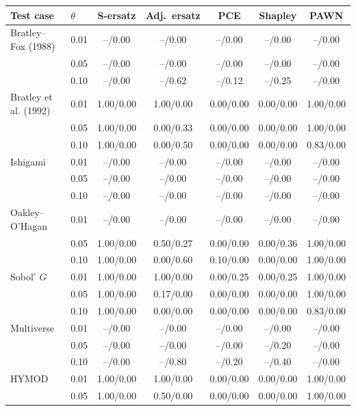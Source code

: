 \documentclass[11pt,a4paper]{article}
\begin{document}
\begin{table}[H]\centering\footnotesize
\begin{tabular}{@{}llccccc@{}}\toprule
Test case & $\theta$ & S-ersatz & Adj.\ ersatz & PCE & Shapley & PAWN \\ \midrule
Bratley--Fox (1988) & 0.01 & --/0.00 & --/0.00 & --/0.00 & --/0.00 & --/0.00 \\
 & 0.05 & --/0.00 & --/0.00 & --/0.00 & --/0.00 & --/0.00 \\
 & 0.10 & --/0.00 & --/0.62 & --/0.12 & --/0.25 & --/0.00 \\
\addlinespace[2pt]
Bratley et al. (1992) & 0.01 & 1.00/0.00 & 1.00/0.00 & 0.00/0.00 & 0.00/0.00 & 1.00/0.00 \\
 & 0.05 & 1.00/0.00 & 0.00/0.33 & 0.00/0.00 & 0.00/0.00 & 1.00/0.00 \\
 & 0.10 & 1.00/0.00 & 0.00/0.50 & 0.00/0.00 & 0.00/0.00 & 0.83/0.00 \\
\addlinespace[2pt]
Ishigami & 0.01 & --/0.00 & --/0.00 & --/0.00 & --/0.00 & --/0.00 \\
 & 0.05 & --/0.00 & --/0.00 & --/0.00 & --/0.00 & --/0.00 \\
 & 0.10 & --/0.00 & --/0.00 & --/0.00 & --/0.00 & --/0.00 \\
\addlinespace[2pt]
Oakley--O'Hagan & 0.01 & --/0.00 & --/0.00 & --/0.00 & --/0.00 & --/0.00 \\
 & 0.05 & 1.00/0.00 & 0.50/0.27 & 0.00/0.00 & 0.00/0.36 & 1.00/0.00 \\
 & 0.10 & 1.00/0.00 & 0.00/0.60 & 0.10/0.00 & 0.00/0.00 & 1.00/0.00 \\
\addlinespace[2pt]
Sobol' $G$ & 0.01 & 1.00/0.00 & 1.00/0.00 & 0.00/0.25 & 0.00/0.25 & 1.00/0.00 \\
 & 0.05 & 1.00/0.00 & 0.17/0.00 & 0.00/0.00 & 0.00/0.00 & 1.00/0.00 \\
 & 0.10 & 1.00/0.00 & 0.00/0.00 & 0.00/0.00 & 0.00/0.00 & 0.83/0.00 \\
\addlinespace[2pt]
Multiverse & 0.01 & --/0.00 & --/0.00 & --/0.00 & --/0.00 & --/0.00 \\
 & 0.05 & --/0.00 & --/0.00 & --/0.00 & --/0.20 & --/0.00 \\
 & 0.10 & --/0.00 & --/0.80 & --/0.20 & --/0.40 & --/0.00 \\
\addlinespace[2pt]
HYMOD & 0.01 & 1.00/0.00 & 1.00/0.00 & 0.00/0.00 & 0.00/0.00 & 1.00/0.00 \\
 & 0.05 & 1.00/0.00 & 0.50/0.00 & 0.00/0.00 & 0.00/0.00 & 1.00/0.00 \\

\end{tabular}
\end{table}
\end{document}
